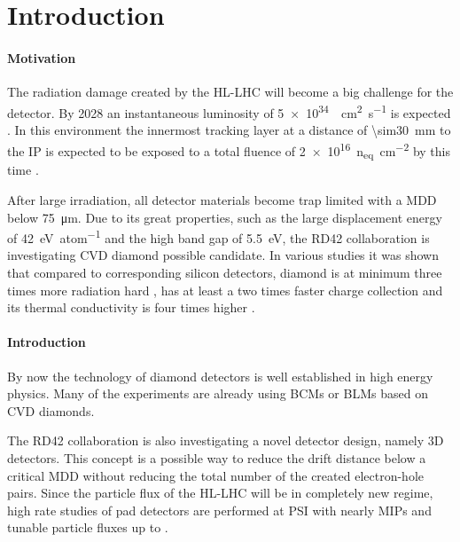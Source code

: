 \section{Introduction}
\paragraph{Motivation} 
The radiation damage created by the \ac{HL-LHC} will become a big challenge for the detector. By 2028 an instantaneous luminosity of \SI{5e34}{\per\centi\meter\squared\per\second} is expected \cite{hllhc}. In this environment the innermost tracking layer at a distance of \SI{\sim30}{\milli\meter} to the \ac{IP} is expected to be exposed to a total fluence of \SI{2e16}{n_{eq}\per \centi\meter^2} by this time \cite{auzinger}.\par
After large irradiation, all detector materials become trap limited with a \ac{MDD} below \SI{75}{\micro\meter}. Due to its great properties, such as the large displacement energy of \SI{42}{\electronvolt\per atom} and the high band gap of \SI{5.5}{\electronvolt}, the RD42 collaboration is investigating \ac{CVD} diamond possible candidate. In various studies it was shown that compared to corresponding silicon detectors, diamond is at minimum three times more radiation hard \cite{deboer}, has at least a two times faster charge collection \cite{pernegger} and its thermal conductivity is four times higher \cite{zhao}.\par
\paragraph{Introduction}
By now the technology of diamond detectors is well established in high energy physics. Many of the experiments are already using \acp{BCM} or \acp{BLM} based on \ac{CVD} diamonds.\par
The RD42 collaboration is also investigating a novel detector design, namely 3D detectors. This concept is a possible way to reduce the drift distance below a critical \ac{MDD} without reducing the total number of the created electron-hole pairs. Since the particle flux of the \ac{HL-LHC} will be in completely new regime, high rate studies of pad detectors are performed at \ac{PSI} with nearly \acp{MIP} and tunable particle fluxes up to .
